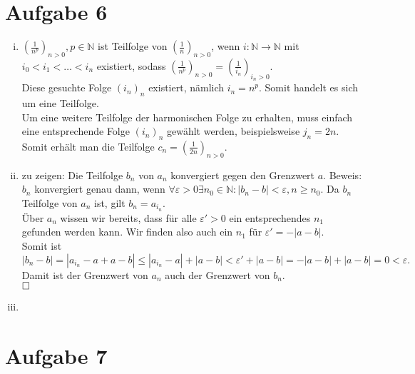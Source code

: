 \documentclass[12pt,a4paper]{article}
\newcommand{\qed}{\null\nobreak\hfill\square}
\begin{document}
\section*{Aufgabe 6}

\begin{enumerate}[(i)]
    \item $(\frac{1}{n^p})_{n > 0}, p \in \mathbb{N}$ ist Teilfolge von $(\frac{1}{n})_{n > 0}$, wenn $i: \mathbb{N} \to \mathbb{N}$ mit $i_0 < i_1 < \ldots < i_n$ existiert, sodass $(\frac{1}{n^p})_{n > 0} = (\frac{1}{i_n})_{i_n > 0}$.\\
    Diese gesuchte Folge $(i_n)_{n}$ existiert, nämlich $i_n = n^p.$
    Somit handelt es sich um eine Teilfolge.\\
    Um eine weitere Teilfolge der harmonischen Folge zu erhalten, muss einfach eine entsprechende Folge $(i_n)_n$ gewählt werden, beispielsweise $j_n = 2n.$
    Somit erhält man die Teilfolge $c_n = (\frac{1}{2n})_{n > 0}.$

    \item zu zeigen: Die Teilfolge $b_n$ von $a_n$ konvergiert gegen den Grenzwert $a$.
    Beweis:\\
    $b_n$ konvergiert genau dann, wenn $\forall \varepsilon > 0 \exists n_0 \in \mathbb{N}: |b_n - b| < \varepsilon, n \geq n_0.$
    Da $b_n$ Teilfolge von $a_n$ ist, gilt $b_n = a_{i_n}.$\\
    Über $a_n$ wissen wir bereits, dass für alle $\varepsilon' > 0$ ein entsprechendes $n_1$ gefunden werden kann.
    Wir finden also auch ein $n_1$ für $\varepsilon' = -|a-b|.$\\
    Somit ist $|b_n - b| = |a_{i_n} - a + a - b| \leq |a_{i_n} - a| + |a - b| < \varepsilon' + |a - b| = -|a - b| + |a - b| = 0 < \varepsilon.$\\
    Damit ist der Grenzwert von $a_n$ auch der Grenzwert von $b_n$.\\
    $\qed$

    \item
\end{enumerate}


\section*{Aufgabe 7}
\end{document}
